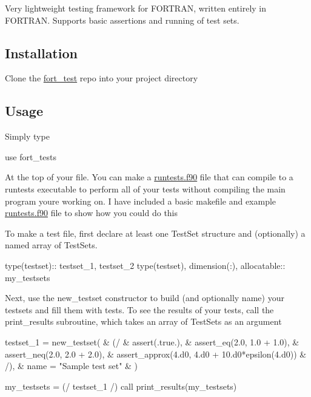 Very lightweight testing framework for F\+O\+R\+T\+R\+AN, written entirely in F\+O\+R\+T\+R\+AN. Supports basic assertions and running of test sets.

\subsection*{Installation}

Clone the \hyperlink{namespacefort__test}{fort\+\_\+test} repo into your project directory

\subsection*{Usage}

Simply type


\begin{DoxyCode}
use fort\_tests
\end{DoxyCode}


At the top of your file. You can make a \hyperlink{runtests_8f90}{runtests.\+f90} file that can compile to a runtests executable to perform all of your tests without compiling the main program you\textquotesingle{}re working on. I have included a basic makefile and example \hyperlink{runtests_8f90}{runtests.\+f90} file to show how you could do this

To make a test file, first declare at least one {\ttfamily Test\+Set} structure and (optionally) a named array of {\ttfamily Test\+Set}s.


\begin{DoxyCode}
\textcolor{keywordtype}{type}(testset):: testset\_1, testset\_2
\textcolor{keywordtype}{type}(testset), \textcolor{keywordtype}{dimension(:)}, \textcolor{keywordtype}{allocatable}:: my\_testsets
\end{DoxyCode}


Next, use the {\ttfamily new\+\_\+testset} constructor to build (and optionally name) your testsets and fill them with tests. To see the results of your tests, call the {\ttfamily print\+\_\+results} subroutine, which takes an array of {\ttfamily Test\+Sets} as an argument


\begin{DoxyCode}
testset\_1 = new\_testset(    &
  (/                        &
    assert(.true.),         &
    assert\_eq(2.0, 1.0 + 1.0),  &
    assert\_neq(2.0, 2.0 + 2.0), &
    assert\_approx(4.d0, 4.d0 + 10.d0*epsilon(4.d0)) &
  /),                       &
  name = \textcolor{stringliteral}{"Sample test set"}  &
)

my\_testsets = (/ testset\_1 /)
\textcolor{keyword}{call }print\_results(my\_testsets)
\end{DoxyCode}



